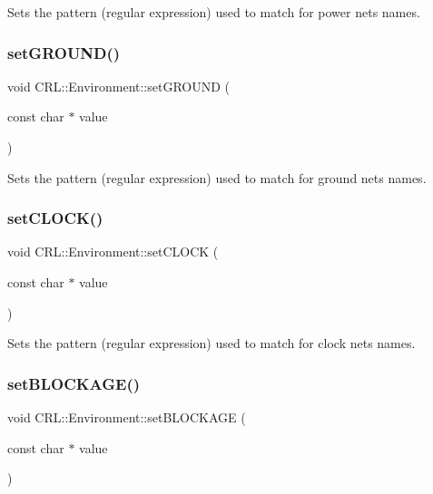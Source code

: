Sets the pattern (regular expression) used to match for power nets names. \mbox{\label{classCRL_1_1Environment_ac956b6814f89975563a3667945599fb2}} 
\subsubsection{\texorpdfstring{set\+G\+R\+O\+U\+N\+D()}{setGROUND()}}
{\footnotesize\ttfamily void C\+R\+L\+::\+Environment\+::set\+G\+R\+O\+U\+ND (\begin{DoxyParamCaption}\item[{const char $\ast$}]{value }\end{DoxyParamCaption})}

Sets the pattern (regular expression) used to match for ground nets names. \mbox{\label{classCRL_1_1Environment_a7ddc44d7f27745179c397445bce35c58}} 
\subsubsection{\texorpdfstring{set\+C\+L\+O\+C\+K()}{setCLOCK()}}
{\footnotesize\ttfamily void C\+R\+L\+::\+Environment\+::set\+C\+L\+O\+CK (\begin{DoxyParamCaption}\item[{const char $\ast$}]{value }\end{DoxyParamCaption})}

Sets the pattern (regular expression) used to match for clock nets names. \mbox{\label{classCRL_1_1Environment_af18cbbcdfb458b69dbb6de0dbb564a3a}} 
\subsubsection{\texorpdfstring{set\+B\+L\+O\+C\+K\+A\+G\+E()}{setBLOCKAGE()}}
{\footnotesize\ttfamily void C\+R\+L\+::\+Environment\+::set\+B\+L\+O\+C\+K\+A\+GE (\begin{DoxyParamCaption}\item[{const char $\ast$}]{value }\end{DoxyParamCaption})}

